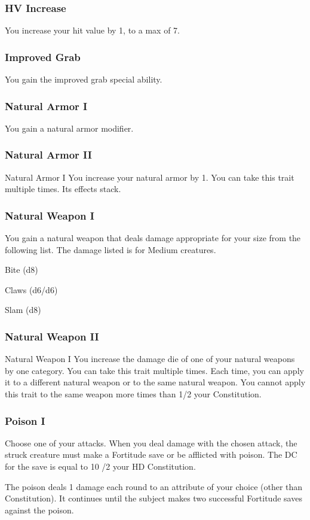 \subsubsection{HV Increase}
\featben You increase your hit value by 1, to a max of 7.
\subsubsection{Improved Grab}
\featben You gain the improved grab special ability. 

\subsubsection{Natural Armor I}
\featben You gain a  natural armor modifier.

\subsubsection{Natural Armor II}
\featpre Natural Armor I
\featben You increase your natural armor by 1.
 You can take this trait multiple times. Its effects stack.

\subsubsection{Natural Weapon I}
\featben You gain a natural weapon that deals damage appropriate for your size from the following list. The damage listed is for Medium creatures.
\begin{itemize*}
    \item Bite (d8)
    \item Claws (d6/d6)
    \item Slam (d8)
\end{itemize*}

\subsubsection{Natural Weapon II}
\featpre Natural Weapon I
\featben You increase the damage die of one of your natural weapons by one category.
 You can take this trait multiple times. Each time, you can apply it to a different natural weapon or to the same natural weapon. You cannot apply this trait to the same weapon more times than 1/2 your Constitution. 

\subsubsection{Poison I}
Choose one of your attacks.
\featben When you deal damage with the chosen attack, the struck creature must make a Fortitude save or be afflicted with poison. The DC for the save is equal to 10 /2 your HD \add Constitution.
\par The poison deals 1 damage each round to an attribute of your choice (other than Constitution). It continues until the subject makes two successful Fortitude saves against the poison.

